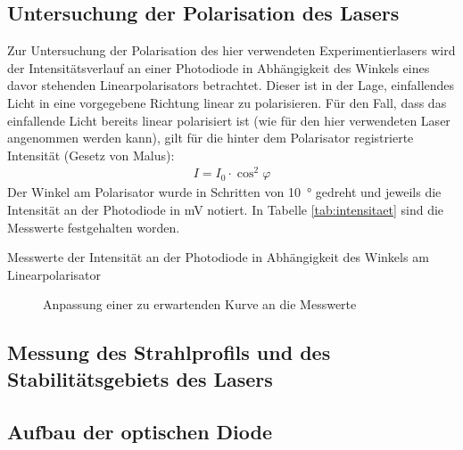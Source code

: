 \documentclass[11pt, a4paper]{article}
\numberwithin{equation}{section}
\begin{document}
\subsection{Untersuchung der Polarisation des Lasers}
\label{ssec:polarisation}
Zur Untersuchung der Polarisation des hier verwendeten Experimentierlasers wird der Intensitätsverlauf an einer Photodiode in Abhängigkeit des Winkels eines davor stehenden Linearpolarisators betrachtet.
Dieser ist in der Lage, einfallendes Licht in eine vorgegebene Richtung linear zu polarisieren.
Für den Fall, dass das einfallende Licht bereits linear polarisiert ist (wie für den hier verwendeten Laser angenommen werden kann), gilt für die hinter dem Polarisator registrierte Intensität (Gesetz von Malus):
\begin{align}
I=I_0\cdot\cos^2\varphi
\end{align}
Der Winkel am Polarisator wurde in Schritten von \SI{10}{\degree} gedreht und jeweils die Intensität an der Photodiode in \si{\milli\volt} notiert.
In Tabelle \ref{tab:intensitaet} sind die Messwerte festgehalten worden.
\begin{table}
	\centering
	
	\caption{Messwerte der Intensität an der Photodiode in Abhängigkeit des Winkels am Linearpolarisator}
	\label{tab:intensitaet}
\end{table}

\begin{figure}
	\centering
	
	\caption{Anpassung einer zu erwartenden Kurve an die Messwerte}
	\label{fig:malus}
\end{figure}

\subsection{Messung des Strahlprofils und des Stabilitätsgebiets des Lasers}

\subsection{Aufbau der optischen Diode}
\end{document}
